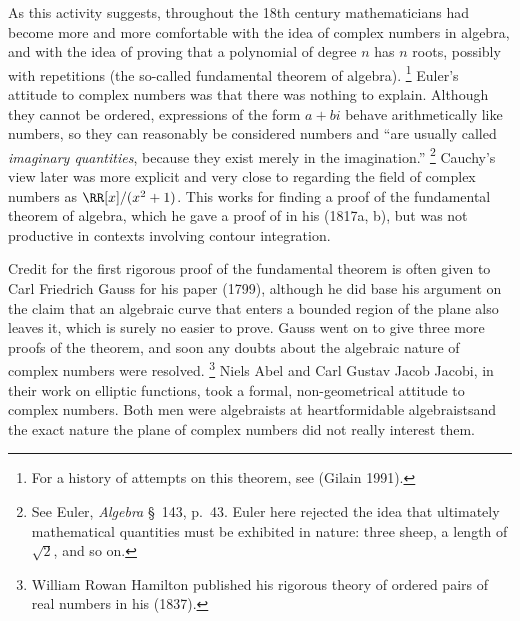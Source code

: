 As this activity suggests, throughout the 18th century mathematicians
had become more and more comfortable with the idea of complex numbers in
algebra, and with the idea of proving that a polynomial of degree $n$ has
$n$ roots, possibly with repetitions (the so-called fundamental theorem
of
%
algebra).%
%
\footnote{For a history of attempts on this theorem, see (Gilain 1991).} 
%
Euler's attitude to complex numbers was that there was
%
nothing to explain. Although they cannot be ordered, expressions of the
form $a+bi$  behave arithmetically like numbers, so they can reasonably be
%
considered numbers  and ``are usually called \emph{imaginary quantities},
because they exist merely in the imagination.''%
\footnote{See Euler,
\emph{Algebra} \S\, 143, p.~43. Euler here rejected the idea that
ultimately mathematical quantities must be exhibited in nature: three
sheep, a length of $\sqrt{2}$, and so on.}
%
Cauchy's view later was more
explicit and very close to regarding  the field of complex numbers as
$\RR [x]/(x^2 + 1)$. This works for finding a proof of the fundamental
theorem of algebra, which he gave a proof of in his (1817a, b), but was
not productive in contexts involving contour integration.
%


Credit for the first rigorous proof of the fundamental theorem is often
given to Carl Friedrich Gauss
%
for his paper (1799), although he did
base his argument on the claim that an algebraic curve that enters a
bounded region of the plane also leaves it,  which is surely no easier
to prove.  Gauss went on to give three more proofs of the theorem,
and soon any doubts about the algebraic nature of complex numbers were
resolved.%
%
\footnote{William Rowan Hamilton
%
published his rigorous theory
of ordered pairs of real numbers in his (1837).}
%
Niels Abel
%
and Carl Gustav Jacob Jacobi,
%
 in their work  on elliptic functions, took a formal,
non-geometrical attitude to complex numbers.  Both men were algebraists
at heart\emdash formidable algebraists\emdash and the exact nature the
plane of complex numbers did not really interest them.

